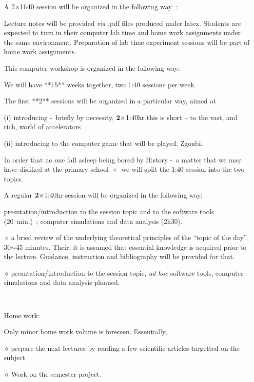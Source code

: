 \documentclass[12pt]{article}
\newcommand{\sid}{{\small \ensuremath{\diamond~}}}
\begin{document}
A 2$\times$1h40  session 
will be organized in the following way~: 



\bigskip

Lecture notes will be provided \textsl{via} .pdf files produced under latex. Students are expected to turn in their 
computer lab time and home work assignments under the same environment. 
Preparation of lab time experiment sessions will be part of home work assignments.

 




This computer workshop is organized in the following way:


We will have **15** weeks together, two 1:40 sessions per week. 

The first **2** sessions will be organized in a particular way, aimed at 

(i) introducing -~briefly by necessity, $\bf 2\times $1:40hr this is short~- to the vast, and rich, world of accelerators

(ii) introducing to the computer game that will be played, Zgoubi. 

In order that no one fall asleep being bored by History -~a matter that we may have disliked at the primary school~\sid 
we will split the 1:40 session into the two topics.


A regular $\bf 2\times $1:40hr session will be organized in the following way:

presntation/introduction to the session topic and to the software tools (20~min.)~; computer simulations and data analysis (2h30). 

\sid  a bried review of the  underlying theoretical principles of the ``topic of the day'', 30$\sim$45 minutes. 
Their, it is assumed that essential knowledge is acquired prior to the lecture. 
Guidance, instruction and bibliography will be provided for that.

\sid  presntation/introduction to the session topic,  \textsl{ad hoc} software tools,  computer simulations
and data analysis planned.

~

Home work:

\bigskip

Only minor home work volume is foreseen. Essentially,

\sid prepare the next lectures  by reading a few scientific articles targetted on the subject

\sid Work on the semester project.
\end{document}
